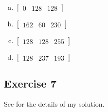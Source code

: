 \documentclass[11pt]{article}
\begin{document}
\begin{enumerate}[a.]
	\item $\begin{bmatrix} 0 & 128 & 128 \end{bmatrix}$
	\item $\begin{bmatrix} 162 & 60 & 230 \end{bmatrix}$
	\item $\begin{bmatrix} 128 & 128 & 255 \end{bmatrix}$
	\item $\begin{bmatrix} 128 & 237 & 193 \end{bmatrix}$
\end{enumerate}

\subsection{Exercise 7}

See  for the details of my solution.
\end{document}

